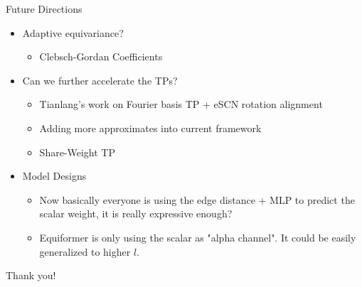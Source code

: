 \documentclass[pdf,serif]{beamer}
\newcommand{\empy}[1]{{\color{BerkeleyGold}\emph{#1}}}
\newcommand{\empr}[1]{{\color{BerkeleyBlue}\emph{#1}}}
\begin{document}
\begin{frame}{Future Directions}{}
    \begin{itemize}
        \item Adaptive equivariance?
        \begin{itemize}
            \item Clebsch-Gordan Coefficients
        \end{itemize}
        \item Can we further accelerate the TPs?
        \begin{itemize}
            \item Tianlang's work on Fourier basis TP + eSCN rotation alignment
            \item Adding more approximates into current framework
            \item Share-Weight TP
        \end{itemize}
        \item Model Designs
        \begin{itemize}
            \item Now basically everyone is using the edge distance + MLP to predict the scalar weight, it is really expressive enough?
            \item Equiformer is only using the scalar as "alpha channel". It could be easily generalized to higher $l$.
        \end{itemize}
    \end{itemize}
\end{frame}

\begin{frame}
    \centering
    \Huge
    Thank you!
\end{frame}

\end{document}
